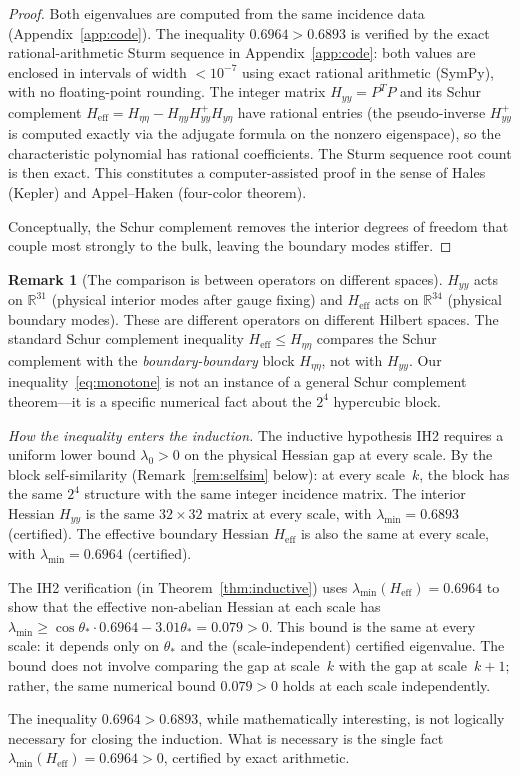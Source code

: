 \documentclass[11pt]{article}
\theoremstyle{definition}
\newtheorem{remark}[theorem]{Remark}
\newcommand{\R}{\mathbb{R}}
\begin{document}
\begin{proof}
Both eigenvalues are computed from the same incidence data
(Appendix~\ref{app:code}).  The inequality $0.6964>0.6893$ is verified
by the exact rational-arithmetic Sturm sequence in
Appendix~\ref{app:code}: both values are enclosed in intervals of
width $<10^{-7}$ using exact rational arithmetic (SymPy), with no
floating-point rounding.  The integer matrix $H_{yy}=P^TP$ and
its Schur complement $H_{\mathrm{eff}}
=H_{\eta\eta}-H_{\eta y}H_{yy}^+H_{y\eta}$ have rational entries
(the pseudo-inverse $H_{yy}^+$ is computed exactly via the adjugate
formula on the nonzero eigenspace), so the characteristic polynomial
has rational coefficients.  The Sturm sequence root count is then
exact.  This constitutes a computer-assisted proof in the sense of
Hales (Kepler) and Appel--Haken (four-color theorem).

Conceptually, the Schur complement removes the interior
degrees of freedom that couple most strongly to the bulk, leaving the
boundary modes stiffer.
\end{proof}

\begin{remark}[The comparison is between operators on different
spaces]\label{rem:monotone-spaces}
$H_{yy}$ acts on $\R^{31}$ (physical interior modes after gauge
fixing) and $H_{\mathrm{eff}}$ acts on $\R^{34}$ (physical boundary
modes).  These are different operators on different Hilbert spaces.
The standard Schur complement inequality
$H_{\mathrm{eff}}\le H_{\eta\eta}$ compares the Schur complement with
the \emph{boundary-boundary} block $H_{\eta\eta}$, not with $H_{yy}$.
Our inequality~\eqref{eq:monotone} is not an instance of a general
Schur complement theorem---it is a specific numerical fact
about the $2^4$ hypercubic block.

\emph{How the inequality enters the induction.}
The inductive hypothesis IH2 requires a uniform lower bound
$\lambda_0>0$ on the physical Hessian gap at every scale.  By the
block self-similarity (Remark~\ref{rem:selfsim} below): at
every scale~$k$, the block has the same $2^4$ structure with the same
integer incidence matrix.  The interior Hessian $H_{yy}$ is the same
$32\times 32$ matrix at every scale, with
$\lambda_{\min}=0.6893$ (certified).
The effective boundary Hessian $H_{\mathrm{eff}}$ is also the same at
every scale, with $\lambda_{\min}=0.6964$ (certified).

The IH2 verification (in Theorem~\ref{thm:inductive}) uses
$\lambda_{\min}(H_{\mathrm{eff}})=0.6964$ to show that the
effective non-abelian Hessian at each scale has
$\lambda_{\min}\ge\cos\theta_*\cdot 0.6964-3.01\theta_*=0.079>0$.
This bound is the same at every scale:
it depends only on $\theta_*$ and the (scale-independent) certified
eigenvalue.  The bound does not involve comparing the gap at
scale~$k$ with the gap at scale~$k+1$; rather, the same
numerical bound $0.079>0$ holds at each scale independently.

The inequality $0.6964>0.6893$, while mathematically
interesting, is not logically necessary for closing the induction.
What is necessary is the single fact
$\lambda_{\min}(H_{\mathrm{eff}})=0.6964>0$, certified by
exact arithmetic.
\end{remark}
\end{document}
